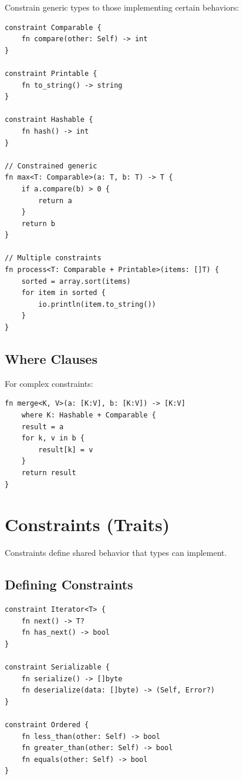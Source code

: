 Constrain generic types to those implementing certain behaviors:

\begin{lstlisting}
constraint Comparable {
    fn compare(other: Self) -> int
}

constraint Printable {
    fn to_string() -> string
}

constraint Hashable {
    fn hash() -> int
}

// Constrained generic
fn max<T: Comparable>(a: T, b: T) -> T {
    if a.compare(b) > 0 {
        return a
    }
    return b
}

// Multiple constraints
fn process<T: Comparable + Printable>(items: []T) {
    sorted = array.sort(items)
    for item in sorted {
        io.println(item.to_string())
    }
}
\end{lstlisting}

\subsection{Where Clauses}

For complex constraints:

\begin{lstlisting}
fn merge<K, V>(a: [K:V], b: [K:V]) -> [K:V]
    where K: Hashable + Comparable {
    result = a
    for k, v in b {
        result[k] = v
    }
    return result
}
\end{lstlisting}

\section{Constraints (Traits)}

Constraints define shared behavior that types can implement.

\subsection{Defining Constraints}

\begin{lstlisting}
constraint Iterator<T> {
    fn next() -> T?
    fn has_next() -> bool
}

constraint Serializable {
    fn serialize() -> []byte
    fn deserialize(data: []byte) -> (Self, Error?)
}

constraint Ordered {
    fn less_than(other: Self) -> bool
    fn greater_than(other: Self) -> bool
    fn equals(other: Self) -> bool
}
\end{lstlisting}

